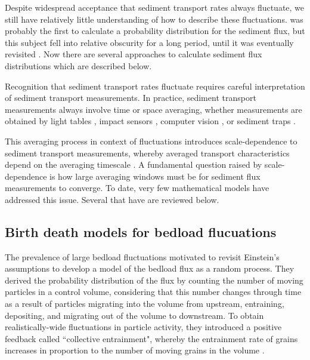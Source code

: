 Despite widespread acceptance that sediment transport rates always fluctuate, we still have relatively little understanding of how to describe these fluctuations. \citet{Hamamori1962} was probably the first to calculate a probability distribution for the sediment flux, but this subject fell into relative obscurity for a long period, until it was eventually revisited \citep{Nikora1997,Ancey2006}. Now there are several approaches to calculate sediment flux distributions which are described below.

Recognition that sediment transport rates fluctuate requires careful interpretation of sediment transport measurements. 
In practice, sediment transport measurements always involve time or space averaging, whether measurements are obtained by light tables \citep{Chartrand2018}, impact sensors \citep{Rickenmann2007}, computer vision \citep{Roseberry2012}, or sediment traps \citep{Papangelakis2016}.

This averaging process in context of fluctuations introduces scale-dependence to sediment transport measurements, whereby averaged transport characteristics depend on the averaging timescale \citep{Turowski2010,Campagnol2012,Ancey2020a}.
A fundamental question raised by scale-dependence is how large averaging windows must be for sediment flux measurements to converge.
To date, very few mathematical models have addressed this issue. Several that have are reviewed below.

\subsection{Birth death models for bedload flucuations}
\label{sec:birthdeath}
The prevalence of large bedload fluctuations motivated \citet{Ancey2006,Ancey2008} to revisit Einstein's assumptions to develop a model of the bedload flux as a random process.
They derived the probability distribution of the flux by counting the number of moving particles in a control volume, considering that this number changes through time as a result of particles migrating into the volume from upstream, entraining, depositing, and migrating out of the volume to downstream.
To obtain realistically-wide fluctuations in particle activity, they introduced a positive feedback called ``collective entrainment", whereby the entrainment rate of grains increases in proportion to the number of moving grains in the volume \citep{Ancey2008,Heyman2013}.


